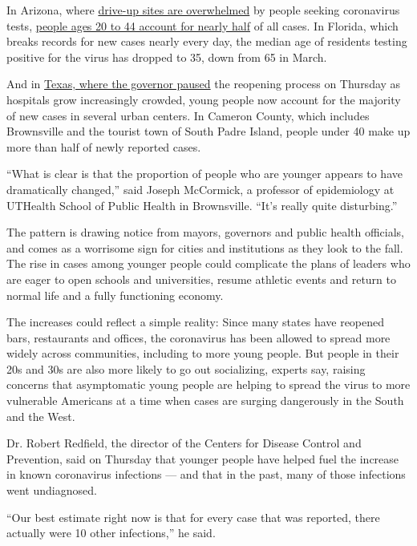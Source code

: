 In Arizona, where
\href{https://www.nytimes3xbfgragh.onion/2020/06/25/upshot/virus-testing-shortfall-arizona.html}{drive-up
sites are overwhelmed} by people seeking coronavirus tests,
\href{https://www.azdhs.gov/preparedness/epidemiology-disease-control/infectious-disease-epidemiology/covid-19/dashboards/index.php}{people
ages 20 to 44 account for nearly half} of all cases. In Florida, which
breaks records for new cases nearly every day, the median age of
residents testing positive for the virus has dropped to 35, down from 65
in March.

And in
\href{https://www.nytimes3xbfgragh.onion/2020/06/25/us/texas-coronavirus-cases-reopening.html}{Texas,
where the governor paused} the reopening process on Thursday as
hospitals grow increasingly crowded, young people now account for the
majority of new cases in several urban centers. In Cameron County, which
includes Brownsville and the tourist town of South Padre Island, people
under 40 make up more than half of newly reported cases.

``What is clear is that the proportion of people who are younger appears
to have dramatically changed,'' said Joseph McCormick, a professor of
epidemiology at UTHealth School of Public Health in Brownsville. ``It's
really quite disturbing.''

The pattern is drawing notice from mayors, governors and public health
officials, and comes as a worrisome sign for cities and institutions as
they look to the fall. The rise in cases among younger people could
complicate the plans of leaders who are eager to open schools and
universities, resume athletic events and return to normal life and a
fully functioning economy.

The increases could reflect a simple reality: Since many states have
reopened bars, restaurants and offices, the coronavirus has been allowed
to spread more widely across communities, including to more young
people. But people in their 20s and 30s are also more likely to go out
socializing, experts say, raising concerns that asymptomatic young
people are helping to spread the virus to more vulnerable Americans at a
time when cases are surging dangerously in the South and the West.

Dr. Robert Redfield, the director of the Centers for Disease Control and
Prevention, said on Thursday that younger people have helped fuel the
increase in known coronavirus infections --- and that in the past, many
of those infections went undiagnosed.

``Our best estimate right now is that for every case that was reported,
there actually were 10 other infections,'' he said.

